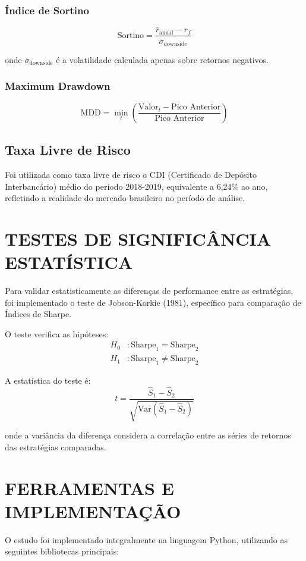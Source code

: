 \subsubsection{Índice de Sortino}
$$\text{Sortino} = \frac{\bar{r}_{\text{anual}} - r_f}{\sigma_{\text{downside}}}$$

onde $\sigma_{\text{downside}}$ é a volatilidade calculada apenas sobre retornos negativos.

\subsubsection{Maximum Drawdown}
$$\text{MDD} = \min_{t} \left( \frac{\text{Valor}_t - \text{Pico Anterior}}{\text{Pico Anterior}} \right)$$

\subsection{Taxa Livre de Risco}

Foi utilizada como taxa livre de risco o CDI (Certificado de Depósito Interbancário) médio do período 2018-2019, equivalente a 6,24\% ao ano, refletindo a realidade do mercado brasileiro no período de análise.

\section{TESTES DE SIGNIFICÂNCIA ESTATÍSTICA}

Para validar estatisticamente as diferenças de performance entre as estratégias, foi implementado o teste de Jobson-Korkie (1981), específico para comparação de Índices de Sharpe.

O teste verifica as hipóteses:
\begin{align}
H_0&: \text{Sharpe}_1 = \text{Sharpe}_2 \\
H_1&: \text{Sharpe}_1 \neq \text{Sharpe}_2
\end{align}

A estatística do teste é:
$$t = \frac{\hat{S}_1 - \hat{S}_2}{\sqrt{\text{Var}(\hat{S}_1 - \hat{S}_2)}}$$

onde a variância da diferença considera a correlação entre as séries de retornos das estratégias comparadas.

\section{FERRAMENTAS E IMPLEMENTAÇÃO}

O estudo foi implementado integralmente na linguagem Python, utilizando as seguintes bibliotecas principais:

